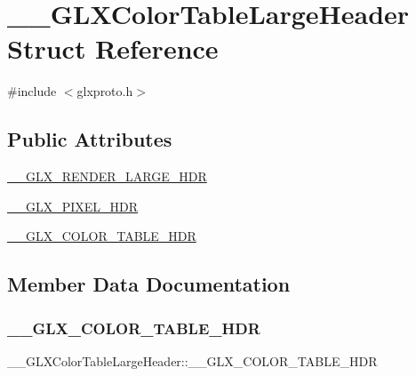 \hypertarget{struct_____g_l_x_color_table_large_header}{}\section{\+\_\+\+\_\+\+G\+L\+X\+Color\+Table\+Large\+Header Struct Reference}
\label{struct_____g_l_x_color_table_large_header}


{\ttfamily \#include $<$glxproto.\+h$>$}

\subsection*{Public Attributes}
\begin{DoxyCompactItemize}
\item 
\hyperlink{struct_____g_l_x_color_table_large_header_a9319faddd94847f8f0144d1370ec3ae1}{\+\_\+\+\_\+\+G\+L\+X\+\_\+\+R\+E\+N\+D\+E\+R\+\_\+\+L\+A\+R\+G\+E\+\_\+\+H\+DR}
\item 
\hyperlink{struct_____g_l_x_color_table_large_header_a3305385960177699b908680ce171314a}{\+\_\+\+\_\+\+G\+L\+X\+\_\+\+P\+I\+X\+E\+L\+\_\+\+H\+DR}
\item 
\hyperlink{struct_____g_l_x_color_table_large_header_ab89424e4c22ebb2f66f31adb45f772a5}{\+\_\+\+\_\+\+G\+L\+X\+\_\+\+C\+O\+L\+O\+R\+\_\+\+T\+A\+B\+L\+E\+\_\+\+H\+DR}
\end{DoxyCompactItemize}


\subsection{Member Data Documentation}
\mbox{\label{struct_____g_l_x_color_table_large_header_ab89424e4c22ebb2f66f31adb45f772a5}} 
\subsubsection{\texorpdfstring{\+\_\+\+\_\+\+G\+L\+X\+\_\+\+C\+O\+L\+O\+R\+\_\+\+T\+A\+B\+L\+E\+\_\+\+H\+DR}{\_\_GLX\_COLOR\_TABLE\_HDR}}
{\footnotesize\ttfamily \+\_\+\+\_\+\+G\+L\+X\+Color\+Table\+Large\+Header\+::\+\_\+\+\_\+\+G\+L\+X\+\_\+\+C\+O\+L\+O\+R\+\_\+\+T\+A\+B\+L\+E\+\_\+\+H\+DR}

